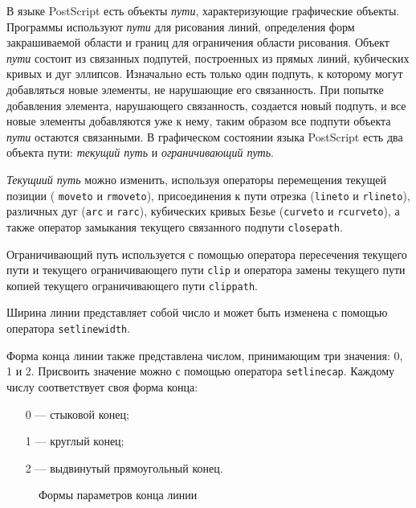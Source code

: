 В языке PostScript есть объекты \textit{пути}, характеризующие графические объекты. Программы используют \textit{пути} для рисования линий, определения форм закрашиваемой области и границ для ограничения области рисования. 
Объект \textit{пути} состоит из связанных подпутей, построенных из прямых линий, кубических кривых и дуг эллипсов. Изначально есть только один подпуть, к которому могут добавляться новые элементы, не нарушающие его связанность. При попытке добавления элемента, нарушающего связанность, создается новый подпуть, и все новые элементы добавляются уже к нему, таким образом все подпути объекта \textit{пути} остаются связанными. В графическом состоянии языка PostScript есть два объекта пути: \textit{текущий путь} и \textit{ограничивающий путь}. 

\textit{Текущиий путь} можно изменить, используя операторы перемещения текущей позиции ( \texttt{moveto} и \texttt{rmoveto}), присоединения к пути отрезка (\texttt{lineto} и \texttt{rlineto}), различных дуг (\texttt{arc} и \texttt{rarc}), кубических кривых Безье (\texttt{curveto} и \texttt{rcurveto}), а также оператор замыкания текущего связанного подпути \texttt{closepath}.

Ограничивающий путь используется с помощью оператора пересечения текущего пути и текущего ограничивающего пути \texttt{clip} и оператора замены текущего пути копией текущего ограничивающего пути \texttt{clippath}.

Ширина линии представляет собой число и может быть изменена с помощью оператора \texttt{setlinewidth}.

Форма конца линии также представлена числом, принимающим три значения: 0, 1 и 2. Присвоить значение можно с помощью оператора \texttt{setlinecap}. Каждому числу соответствует своя форма конца:
\begin{itemize}
\item [0 ---] стыковой конец;
\item [1 ---] круглый конец;
\item [2 ---] выдвинутый прямоугольный конец.
\end{itemize} 

\begin{figure}[t]
\caption{Формы параметров конца линии}\label{pic_linecap}
\end{figure}

